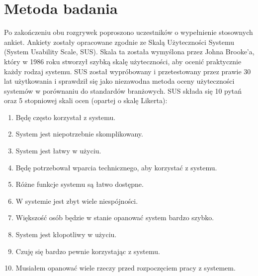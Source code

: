 \section{Metoda badania}
Po zakończeniu obu rozgrywek poproszono uczestników o wypełnienie stosownych ankiet.
Ankiety zostały opracowane zgodnie ze Skalą Użyteczności Systemu (System Usability Scale, SUS).
Skala ta została wymyślona przez Johna Brooke'a, który w 1986 roku stworzył szybką skalę użyteczności, aby
ocenić praktycznie każdy rodzaj systemu. \newline
SUS został wypróbowany i przetestowany przez prawie 30 lat użytkowania i sprawdził się jako
niezawodna metoda oceny użyteczności systemów w porównaniu do standardów branżowych. \newline
SUS składa się 10 pytań oraz 5 stopniowej skali ocen (opartej o skalę Likerta):
\begin{enumerate}
	\item Będę często korzystał z systemu.
	\item System jest niepotrzebnie skomplikowany.
	\item System jest łatwy w użyciu.
	\item Będę potrzebował wparcia technicznego, aby korzystać z systemu.
	\item Różne funkcje systemu są łatwo dostępne.
	\item W systemie jest zbyt wiele niespójności.
	\item Większość osób będzie w stanie opanować system bardzo szybko.
	\item System jest kłopotliwy w użyciu.
	\item Czuję się bardzo pewnie korzystając z systemu.
	\item Musiałem opanować wiele rzeczy przed rozpoczęciem pracy z systemem.
\end{enumerate}

